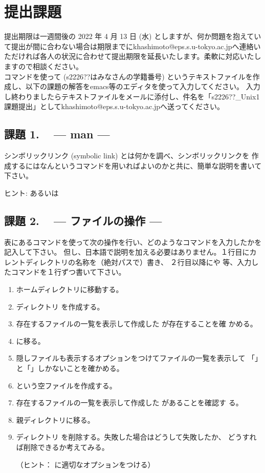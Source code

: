\documentclass[platex]{jsarticle}
\begin{document}



\newpage
\section{提出課題}
 提出期限は一週間後の 2022 年 4 月 13 日 (水) としますが、何か問題を抱えていて提出が間に合わない場合は期限までにkhashimoto@eps.s.u-tokyo.ac.jpへ連絡いただければ各人の状況に合わせて提出期限を延長いたします。柔軟に対応いたしますので相談ください。\\

 コマンドを使って (s2226??はみなさんの学籍番号) というテキストファイルを作成し、以下の課題の解答をemacs等のエディタを使って入力してください。
 入力し終わりましたらテキストファイルをメールに添付し、件名を「s2226??\_Unix1課題提出」としてkhashimoto@eps.s.u-tokyo.ac.jpへ送ってください。

 \subsection*{課題 1. ~ --- man ---}
  シンボリックリンク (symbolic link) とは何かを調べ、シンボリックリンクを
  作成するにはなんというコマンドを用いればよいのかと共に、簡単な説明を書いて下さい。

  ヒント:  あるいは 

  
 \subsection*{課題 2. ~ --- ファイルの操作 ---}
 表にあるコマンドを使って次の操作を行い、どのようなコマンドを入力したかを記入して下さい。
 但し、日本語で説明を加える必要はありません。１行目にカレントディレクトリの名称を（絶対パスで）書き、
 ２行目以降にや 等、入力したコマンドを１行ずつ書いて下さい。

 \begin{enumerate}
  \item ホームディレクトリに移動する。
  \item ディレクトリ  を作成する。
  \item 存在するファイルの一覧を表示して作成した  が存在することを確
	かめる。
  \item {} に移る。
  \item 隠しファイルも表示するオプションをつけてファイルの一覧を表示して
	「」と「」しかないことを確かめる。
  \item {} という空ファイルを作成する。
  \item 存在するファイルの一覧を表示して作成した があることを確認す
	る。
  \item 親ディレクトリに移る。
  \item ディレクトリ を削除する。失敗した場合はどうして失敗したか、
	どうすれば削除できるか考えてみる。
	
	（ヒント：  に適切なオプションをつける）
 \end{enumerate}
\end{document}

